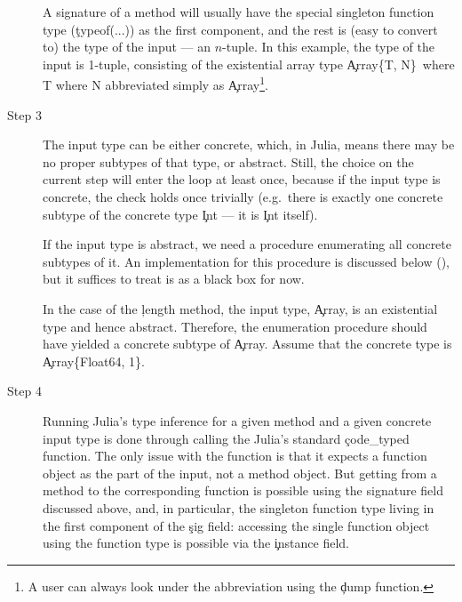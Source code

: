 \begin{description}
  A signature of a method will usually have the special singleton function
  type (\c{typeof(...)}) as the first component, and the rest is (easy to
  convert to) the type of the input --- an $n$-tuple. In this example, the type of
  the input is 1-tuple, consisting of the existential array type
  \c{Array\{T, N\}\ where T where N} abbreviated simply as \c{Array}\footnote{%
A user can always look under the abbreviation using the \c{dump} function.
}.

  \item[Step 3] The input type can be either concrete, which, in Julia, means there may
  be no proper subtypes of that type, or abstract. Still, the choice on the
  current step will enter the loop at least once, because if the input type is
  concrete, the check holds once trivially (e.g.\ there is exactly one concrete
  subtype of the concrete type \c{Int} --- it is \c{Int} itself).

  If the input type is abstract, we need a procedure enumerating all concrete
  subtypes of it. An implementation for this procedure is discussed below
  (), but it suffices to
  treat is as a black box for now.

  In the case of the \c{length} method, the input type, \c{Array}, is
  an existential type and hence abstract. Therefore, the enumeration procedure
  should have yielded a concrete subtype of \c{Array}. Assume that
  the concrete type is \c{Array\{Float64, 1\}}.

  \item[Step 4] Running Julia's type inference for a given method and a given concrete input
  type is done through calling the Julia's standard \c{code\_typed} function.
  The only issue with the function is that it expects a function object as the
  part of the input, not a method object. But getting from a method to the
  corresponding function is possible using the signature field discussed above,
  and, in particular, the singleton function type living in the first component
  of the \c{sig} field: accessing the single function object using the function
  type is possible via the \c{instance} field.


\end{description}
